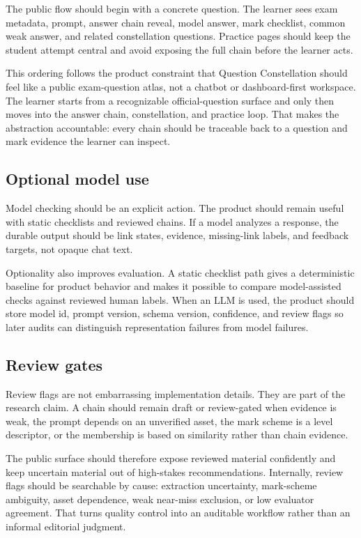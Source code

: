 \documentclass[11pt]{article}
\begin{document}
The public flow should begin with a concrete question. The learner sees exam metadata, prompt, answer chain reveal, model answer, mark checklist, common weak answer, and related constellation questions. Practice pages should keep the student attempt central and avoid exposing the full chain before the learner acts.

This ordering follows the product constraint that Question Constellation should feel like a public exam-question atlas, not a chatbot or dashboard-first workspace. The learner starts from a recognizable official-question surface and only then moves into the answer chain, constellation, and practice loop. That makes the abstraction accountable: every chain should be traceable back to a question and mark evidence the learner can inspect.

\subsection{Optional model use}

Model checking should be an explicit action. The product should remain useful with static checklists and reviewed chains. If a model analyzes a response, the durable output should be link states, evidence, missing-link labels, and feedback targets, not opaque chat text.

Optionality also improves evaluation. A static checklist path gives a deterministic baseline for product behavior and makes it possible to compare model-assisted checks against reviewed human labels. When an LLM is used, the product should store model id, prompt version, schema version, confidence, and review flags so later audits can distinguish representation failures from model failures.

\subsection{Review gates}

Review flags are not embarrassing implementation details. They are part of the research claim. A chain should remain draft or review-gated when evidence is weak, the prompt depends on an unverified asset, the mark scheme is a level descriptor, or the membership is based on similarity rather than chain evidence.

The public surface should therefore expose reviewed material confidently and keep uncertain material out of high-stakes recommendations. Internally, review flags should be searchable by cause: extraction uncertainty, mark-scheme ambiguity, asset dependence, weak near-miss exclusion, or low evaluator agreement. That turns quality control into an auditable workflow rather than an informal editorial judgment.
\end{document}
